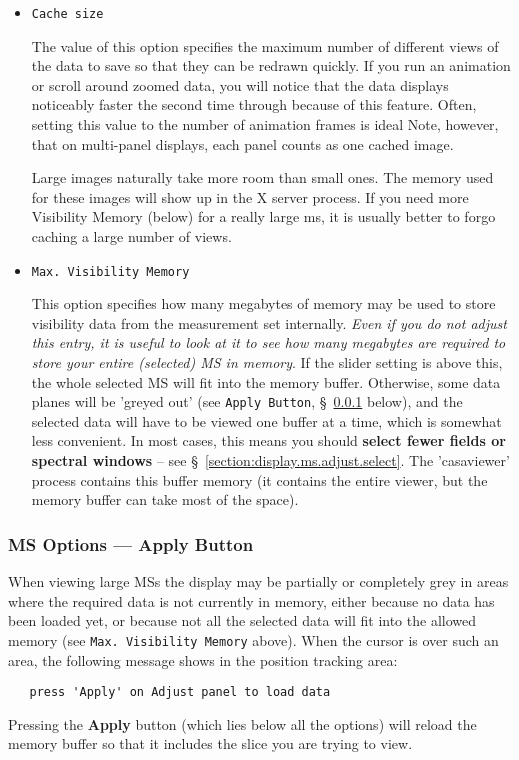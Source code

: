 \begin{itemize}

\item {\tt Cache size}

The value of this option specifies the maximum
number of different views of the data to save so that they
can be redrawn quickly.  If you run an animation or scroll around
zoomed data, you will notice that the data displays noticeably faster
the second time through because of this feature.  Often, setting this
value to the number of animation frames is ideal  Note, however, that
on multi-panel displays, each panel counts as one cached image.

Large images naturally take more room than small ones.  The memory used
for these images will show up in the X server process.  If you need more
Visibility Memory (below) for a really large ms, it is usually better to
forgo caching a large number of views.

\item {\tt Max. Visibility Memory}

This option specifies how many megabytes of memory may be used to store
visibility data from the measurement set internally.  {\it Even if you do
not adjust this entry, it is useful to look at it to see how many megabytes
are required to store your entire (selected) MS in memory}.  If the slider
setting is above this, the whole selected MS will fit into the memory
buffer.  Otherwise, some data planes will be 'greyed out' (see
{\tt Apply Button}, \S~\ref{section:display.ms.adjust.apply} below),
and the selected
data will have to be viewed one buffer at a time, which is somewhat less 
convenient. In most cases, this means you should {\bf select fewer fields
or spectral windows} -- see \S~\ref{section:display.ms.adjust.select}.
The 'casaviewer' process contains this buffer memory (it contains the entire
viewer, but the memory buffer can take most of the space).

\end{itemize}

\subsubsection{MS Options --- Apply Button}
\label{section:display.ms.adjust.apply}

When viewing large MSs the display may be 
partially or completely grey in areas where the required data is not
currently in memory, either because no data has been loaded yet, or
because not all the selected data will fit into the allowed memory
(see {\tt Max. Visibility Memory} above).  When the
cursor is over such an area, the following message shows in the position
tracking area:
\small
\begin{verbatim}
   press 'Apply' on Adjust panel to load data
\end{verbatim}
\normalsize
Pressing the {\bf Apply} button (which lies below all the options) 
will reload the
memory buffer so that it includes the slice you are trying to view.

